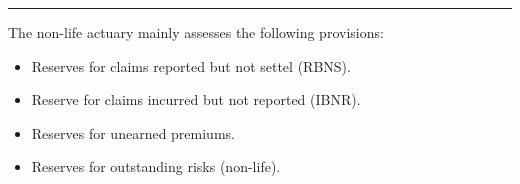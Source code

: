 \hrule

\begin{f}[Provision]
	
The non-life actuary mainly assesses
the following provisions:
\begin{itemize}
	\item Reserves for claims reported but not settel (RBNS).
	\item Reserve for claims incurred but not reported (IBNR).
	\item Reserves for unearned premiums.
	\item Reserves for outstanding risks (non-life).
	
\end{itemize}

\end{f}




